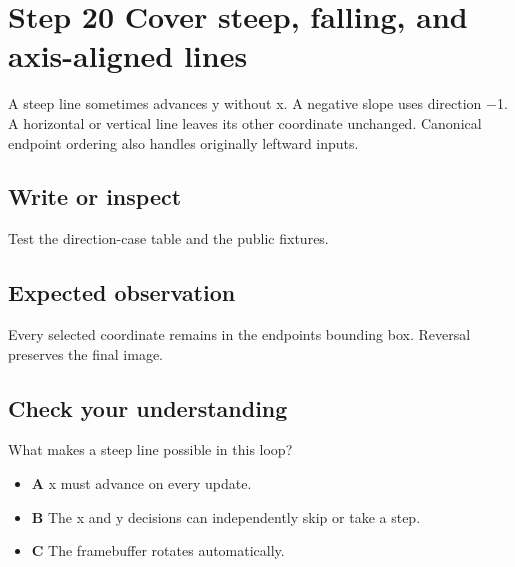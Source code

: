 \section{Step 20 Cover steep, falling, and axis-aligned
  lines}\label{007-bresenham-line-s20-step-20-cover-steep-falling-and-axis-aligned-lines}

A steep line sometimes advances y without x. A negative slope uses
direction \ensuremath{-}1. A horizontal or vertical line leaves its other coordinate
unchanged. Canonical endpoint ordering also handles originally leftward
inputs.

\subsection{Write or
  inspect}\label{007-bresenham-line-s20-write-or-inspect}

Test the direction-case table and the public fixtures.

\subsection{Expected
  observation}\label{007-bresenham-line-s20-expected-observation}

Every selected coordinate remains in the endpoints\textquotesingle{}
bounding box. Reversal preserves the final image.

\subsection{Check your
  understanding}\label{007-bresenham-line-s20-check-your-understanding}

What makes a steep line possible in this loop?

\begin{itemize}
  \tightlist
  \item
        \textbf{A} x must advance on every update.
  \item
        \textbf{B} The x and y decisions can independently skip or take a
        step.
  \item
        \textbf{C} The framebuffer rotates automatically.
\end{itemize}
